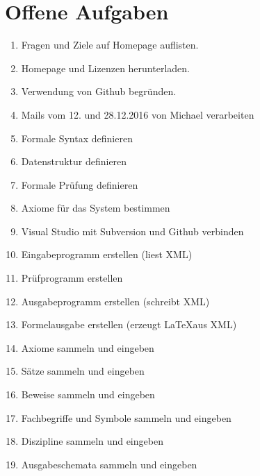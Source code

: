 \documentclass[english,ngerman,parskip=half,headsepline,footsepline]{scrreprt}
\begin{document}
	\section{Offene Aufgaben}
	\begin{enumerate}
		\item Fragen und Ziele auf Homepage auflisten.
		\item Homepage und Lizenzen herunterladen.
		\item Verwendung von Github begründen.
		\item Mails vom 12. und 28.12.2016 von Michael verarbeiten
		\item Formale Syntax definieren
		\item Datenstruktur definieren
		\item Formale Prüfung definieren
		\item Axiome für das System bestimmen
		\item Visual Studio mit Subversion und Github verbinden
		\item Eingabeprogramm erstellen (liest XML)
		\item Prüfprogramm erstellen
		\item Ausgabeprogramm erstellen (schreibt XML)
		\item Formelausgabe erstellen (erzeugt \LaTeX aus XML)
		\item Axiome sammeln und eingeben
		\item Sätze sammeln und eingeben
		\item Beweise sammeln und eingeben
		\item Fachbegriffe und Symbole sammeln und eingeben
		\item Diszipline sammeln und eingeben
		\item Ausgabeschemata sammeln und eingeben
	\end{enumerate}
		


	\listoftables {}
	\listoffigures{}
	\thispagestyle{scrheadings}
	
\end{document}
